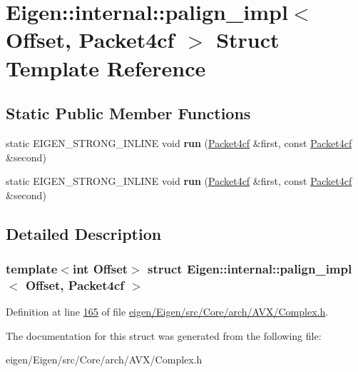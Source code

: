 \hypertarget{struct_eigen_1_1internal_1_1palign__impl_3_01_offset_00_01_packet4cf_01_4}{}\section{Eigen\+:\+:internal\+:\+:palign\+\_\+impl$<$ Offset, Packet4cf $>$ Struct Template Reference}
\label{struct_eigen_1_1internal_1_1palign__impl_3_01_offset_00_01_packet4cf_01_4}
\subsection*{Static Public Member Functions}
\begin{DoxyCompactItemize}
\item 
\mbox{\label{struct_eigen_1_1internal_1_1palign__impl_3_01_offset_00_01_packet4cf_01_4_a143a8ec4ae04105d432ff7d5a294fb57}} 
static E\+I\+G\+E\+N\+\_\+\+S\+T\+R\+O\+N\+G\+\_\+\+I\+N\+L\+I\+NE void {\bfseries run} (\hyperlink{struct_eigen_1_1internal_1_1_packet4cf}{Packet4cf} \&first, const \hyperlink{struct_eigen_1_1internal_1_1_packet4cf}{Packet4cf} \&second)
\item 
\mbox{\label{struct_eigen_1_1internal_1_1palign__impl_3_01_offset_00_01_packet4cf_01_4_a143a8ec4ae04105d432ff7d5a294fb57}} 
static E\+I\+G\+E\+N\+\_\+\+S\+T\+R\+O\+N\+G\+\_\+\+I\+N\+L\+I\+NE void {\bfseries run} (\hyperlink{struct_eigen_1_1internal_1_1_packet4cf}{Packet4cf} \&first, const \hyperlink{struct_eigen_1_1internal_1_1_packet4cf}{Packet4cf} \&second)
\end{DoxyCompactItemize}


\subsection{Detailed Description}
\subsubsection*{template$<$int Offset$>$\newline
struct Eigen\+::internal\+::palign\+\_\+impl$<$ Offset, Packet4cf $>$}



Definition at line \hyperlink{eigen_2_eigen_2src_2_core_2arch_2_a_v_x_2_complex_8h_source_l00165}{165} of file \hyperlink{eigen_2_eigen_2src_2_core_2arch_2_a_v_x_2_complex_8h_source}{eigen/\+Eigen/src/\+Core/arch/\+A\+V\+X/\+Complex.\+h}.



The documentation for this struct was generated from the following file\+:\begin{DoxyCompactItemize}
\item 
eigen/\+Eigen/src/\+Core/arch/\+A\+V\+X/\+Complex.\+h\end{DoxyCompactItemize}
